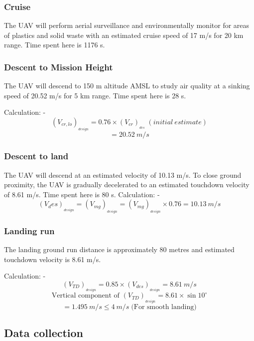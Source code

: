 \documentclass[12 pt]{article}
\begin{document}
\subsubsection{Cruise \cite{alhajjaji2017design}}
The UAV will perform aerial surveillance and environmentally monitor for areas of plastics and solid waste with an estimated cruise speed of 17 m/s for 20 km range. Time spent here is 1176 s.

\subsubsection{Descent to Mission Height}
The UAV will descend to 150 m altitude AMSL to study air quality at a sinking speed of 20.52 m/s for 5 km range. Time spent here is 28 s.

Calculation: - 
$$ (V_{cr,lo})_{_{design}} = 0.76 \times (V_{cr})_{_{des}} \;  (initial \: estimate) $$
$$ = 20.52 \: m/s $$

\subsubsection{Descent to land \cite{Anderson1}}
The UAV will descend at an estimated velocity of 10.13 m/s. To close ground proximity, the UAV is gradually decelerated to an estimated touchdown velocity of 8.61 m/s. Time spent here is 80 s.
Calculation: - 
$$(V_des)_{_{design}} = (V_{mg})_{_{design}} = (V_{mg})_{_{design}} \times 0.76 = 10.13 \: m/s $$

\subsubsection{Landing run}
The landing ground run distance is approximately 80 metres and estimated touchdown velocity is 8.61 m/s.

Calculation: - 
$$ (V_{TD})_{_{design}} = 0.85 \times (V_{des})_{_{design}} = 8.61 \: m/s  $$
$$ \text{Vertical component of } (V_{TD})_{_{design}} = 8.61 \times \sin{10^{\circ}} $$
$$ = 1.495 \: m/s \leq 4 \: m/s \; \text{(For smooth landing)} $$



\subsection{Data collection}
\end{document}
